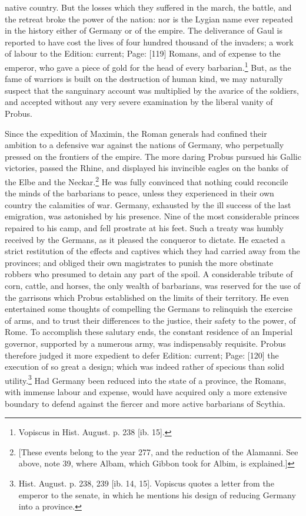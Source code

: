 native country. But the losses which they suffered in the march, the battle, and the retreat broke the power of the nation: nor is the Lygian name ever repeated in the history either of Germany or of the empire. The deliverance of Gaul is reported to have cost the lives of four hundred thousand of the invaders; a work of labour to the Edition: current; Page: [119] Romans, and of expense to the emperor, who gave a piece of gold for the head of every barbarian.\footnote{Vopiscus in Hist. August. p. 238 [ib. 15].} But, as the fame of warriors is built on the destruction of human kind, we may naturally suspect that the sanguinary account was multiplied by the avarice of the soldiers, and accepted without any very severe examination by the liberal vanity of Probus.

Since the expedition of Maximin, the Roman generals had confined their ambition to a defensive war against the nations of Germany, who perpetually pressed on the frontiers of the empire. The more daring Probus pursued his Gallic victories, passed the Rhine, and displayed his invincible eagles on the banks of the Elbe and the Neckar.\footnote{[These events belong to the year 277, and the reduction of the Alamanni. See above, note 39, where Albam, which Gibbon took for Albim, is explained.]} He was fully convinced that nothing could reconcile the minds of the barbarians to peace, unless they experienced in their own country the calamities of war. Germany, exhausted by the ill success of the last emigration, was astonished by his presence. Nine of the most considerable princes repaired to his camp, and fell prostrate at his feet. Such a treaty was humbly received by the Germans, as it pleased the conqueror to dictate. He exacted a strict restitution of the effects and captives which they had carried away from the provinces; and obliged their own magistrates to punish the more obstinate robbers who presumed to detain any part of the spoil. A considerable tribute of corn, cattle, and horses, the only wealth of barbarians, was reserved for the use of the garrisons which Probus established on the limits of their territory. He even entertained some thoughts of compelling the Germans to relinquish the exercise of arms, and to trust their differences to the justice, their safety to the power, of Rome. To accomplish these salutary ends, the constant residence of an Imperial governor, supported by a numerous army, was indispensably requisite. Probus therefore judged it more expedient to defer Edition: current; Page: [120] the execution of so great a design; which was indeed rather of specious than solid utility.\footnote{Hist. August. p. 238, 239 [ib. 14, 15]. Vopiscus quotes a letter from the emperor to the senate, in which he mentions his design of reducing Germany into a province.} Had Germany been reduced into the state of a province, the Romans, with immense labour and expense, would have acquired only a more extensive boundary to defend against the fiercer and more active barbarians of Scythia.

